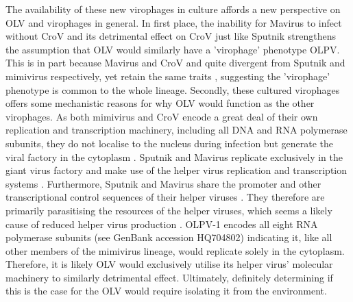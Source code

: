 The availability of these new virophages in culture affords a new perspective on \ac{OLV} and virophages in general.
In first place, the inability for Mavirus to infect without \ac{CroV} and its detrimental effect on \ac{CroV} just like Sputnik strengthens the assumption that OLV would similarly have a 'virophage' phenotype \ac{OLPV}.
This is in part because Mavirus and \ac{CroV} and quite divergent from Sputnik and mimivirus respectively, yet retain the same traits \cite{Fischer2010, Fischer2011}, suggesting the 'virophage' phenotype is common to the whole lineage.
Secondly, these cultured virophages offers some mechanistic reasons for why \ac{OLV} would function as the other virophages.
As both mimivirus and \ac{CroV} encode a great deal of their own replication and transcription machinery, including all \textsc{DNA} and \textsc{RNA} polymerase subunits, they do not localise to the nucleus during infection but generate the viral factory in the cytoplasm \cite{LaScola2008, Fischer2011}.
Sputnik and Mavirus replicate exclusively in the giant virus factory and make use of the helper virus replication and transcription systems \cite{LaScola2008, Fischer2011}.
Furthermore, Sputnik and Mavirus share the promoter and other transcriptional control sequences of their helper viruses \cite{Claverie2009, Fischer2011}.
They therefore are primarily parasitising the resources of the helper viruses, which seems a likely cause of reduced helper virus production \cite{Claverie2009, Fischer2012}.
\ac{OLPV}-1 encodes all eight \textsc{RNA} polymerase subunits (see GenBank accession HQ704802) indicating it, like all other members of the mimivirus lineage, would replicate solely in the cytoplasm.
Therefore, it is likely \ac{OLV} would exclusively utilise its helper virus' molecular machinery to similarly detrimental effect.
Ultimately, definitely determining if this is the case for the \ac{OLV} would require isolating it from the environment.

